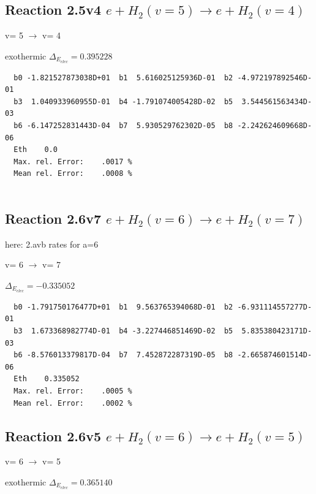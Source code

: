 \documentclass[12pt,dvipdfmx]{article}
\begin{document}
\subsection{
Reaction 2.5v4
$ e + H_2(v=5) \rightarrow e + H_2(v=4) $
}

  v=  5 $\rightarrow$ v= 4

exothermic $\Delta_{E_{elec}}= 0.395228$


\begin{small}\begin{verbatim}
  b0 -1.821527873038D+01  b1  5.616025125936D-01  b2 -4.972197892546D-01
  b3  1.040933960955D-01  b4 -1.791074005428D-02  b5  3.544561563434D-03
  b6 -6.147252831443D-04  b7  5.930529762302D-05  b8 -2.242624609668D-06
  Eth    0.0
  Max. rel. Error:    .0017 %
  Mean rel. Error:    .0008 %


\end{verbatim}\end{small}
\newpage

\subsection{
Reaction 2.6v7
$ e + H_2(v=6) \rightarrow e + H_2(v=7) $
}

here: 2.avb rates for a=6

  v=  6 $\rightarrow$ v= 7

$\Delta_{E_{elec}}=-0.335052$



\begin{small}\begin{verbatim}
  b0 -1.791750176477D+01  b1  9.563765394068D-01  b2 -6.931114557277D-01
  b3  1.673368982774D-01  b4 -3.227446851469D-02  b5  5.835380423171D-03
  b6 -8.576013379817D-04  b7  7.452872287319D-05  b8 -2.665874601514D-06
  Eth    0.335052
  Max. rel. Error:    .0005 %
  Mean rel. Error:    .0002 %

\end{verbatim}\end{small}



\subsection{
Reaction 2.6v5
$ e + H_2(v=6) \rightarrow e + H_2(v=5) $
}

  v=  6 $\rightarrow$ v= 5

exothermic $\Delta_{E_{elec}}= 0.365140$
\end{document}
